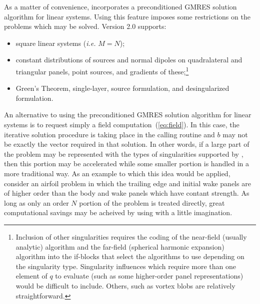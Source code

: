 As a matter of convenience, \fas incorporates a preconditioned 
GMRES solution algorithm for linear systems.  Using 
this feature imposes some restrictions on the problems which may be solved.
\fas Version 2.0 supports:
\begin{itemize}
\item{
square linear systems ({\it i.e.} $M=N$);
}
\item{
constant distributions of sources and normal dipoles on quadralateral 
and triangular panels, point sources, and gradients
of these;\footnote{Inclusion of other singularities requires the coding of 
the near-field (usually analytic) algorithm and the far-field (spherical
harmonic expansion) algorithm into the if-blocks that select the
algorithms to use depending on the singularity type.  Singularity
influences which require more than one element of $q$ to 
evaluate (such as some higher-order panel representations)  
would be difficult to include.  Others, such as vortex blobs are 
relatively straightforward.}
}
\item{
Green's Theorem, single-layer, source formulation, and 
desingularized formulation.
}
\end{itemize}

An alternative to using the  preconditioned GMRES solution algorithm 
for linear systems is to request simply a field 
computation~(\ref{eq:field}).  In this case, the iterative solution 
procedure is taking place in the calling routine and $b$ may not
be exactly the vector required in that solution.  In other words,
if a large part of the problem may be represented with the types
of singularities supported by \fas, then this portion may be
accelerated while some smaller portion is handled in a more 
traditional way.  As an example to which this idea would be 
applied, consider an airfoil problem in which the trailing edge and 
initial wake panels are of higher order than the body and wake panels 
which have contant strength.  As long as only an order $N$ portion of
the problem is treated directly, great computational savings may
be acheived by using \fas with a little imagination.

